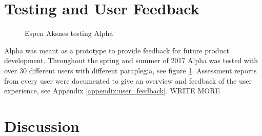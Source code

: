 \section{Testing and User Feedback}
\setlength\floatsep{0pt}
\setlength\intextsep{0pt}
\begin{figure}
    \begin{center}
    {\setlength{\fboxsep}{0pt}\setlength{\fboxrule}{0.5pt}
    }
    \caption{Espen Aksnes testing Alpha}
    \label{alphatest}    
    \end{center}
\end{figure}

Alpha was meant as a prototype to provide feedback for future product development. Throughout the spring and summer of 2017 Alpha was tested with over 30 different users with different paraplegia, see figure \ref{alphatest}. Assessment reports from every user were documented to give an overview and feedback of the user experience, see Appendix \ref{appendix:user_feedback}.
WRITE MORE

\section{Discussion}

